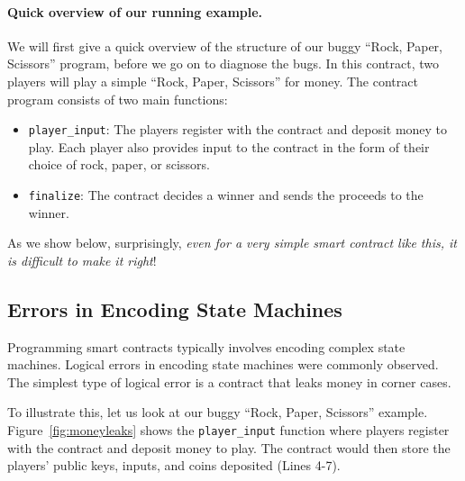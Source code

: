 \documentclass[10pt,twocolumn,letterpaper]{article}
\newcommand{\elaine}[1]{}
\newcommand{\ignore}[1]{}
\begin{document}
\paragraph{Quick overview of our running example.}
We will first give a quick overview of the structure
of our buggy ``Rock, Paper, Scissors'' program, before
we go on to diagnose the bugs.
In this contract, two players 
will play a simple 
``Rock, Paper, Scissors''
for money. 
The contract program consists of two main functions:
\begin{itemize}
\item
{\tt player\_input}:
The players register with the contract
and deposit money to play. Each player 
also provides input to the contract 
in the form of their choice of rock, paper, or scissors.
\item
{\tt finalize}:
The contract decides a winner
and sends the proceeds to the winner. 
\end{itemize}

As we show below, 
surprisingly, {\it even for a very simple smart contract like this, 
it is difficult 
to make it right}!

\elaine{emphasize this in the intro too.}


\ignore{
In this section, we'll explore the security and incentive alignment pitfalls in designing a smart contract. We'll use an easy-to-understand application as a running example, based on a Rock-Paper-Scissors game. We then analyze a plausible (but subtly buggy) initial implementation, pointing out its flaws. Mistakes resembling these were actually observed in our Smart Contract Programming Lab in ``CMSC 414 - Undergraduate Security''. This section is centered around the exercises. We provide hints to guide the reader towards discovering how to improve on them. Our ``reference'' solution can be found in the accompanying materials.
}


\subsection{Errors in Encoding State Machines}

Programming smart contracts typically involves
encoding complex state machines.
Logical errors
in encoding state machines were commonly observed.
The simplest type of logical error is a contract
that leaks money in corner cases.


To illustrate this, let us look at our buggy
``Rock, Paper, Scissors'' example.
Figure~\ref{fig:moneyleaks}
shows the {\tt player\_input} function
where players register with the contract and  
deposit money to play.
The contract would then store the players'
public keys, inputs,
and coins deposited (Lines 4-7).
\end{document}

